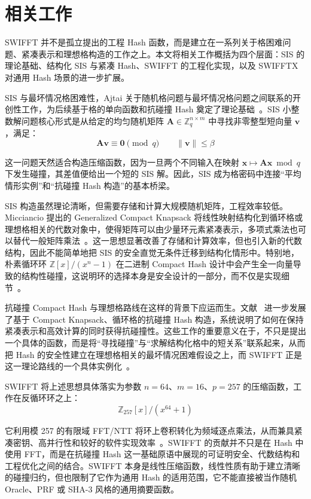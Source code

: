 \documentclass{article}
\begin{document}
\section{相关工作}
SWIFFT 并不是孤立提出的工程 Hash 函数，而是建立在一系列关于格困难问题、紧凑表示和理想格构造的工作之上。本文将相关工作概括为四个层面：SIS 的理论基础、结构化 SIS 与紧凑 Hash、SWIFFT 的工程化实现，以及 SWIFFTX 对通用 Hash 场景的进一步扩展。

SIS 与最坏情况格困难性，Ajtai 关于随机格问题与最坏情况格问题之间联系的开创性工作，为后续基于格的单向函数和抗碰撞 Hash 奠定了理论基础~\cite{Ajtai96}。SIS 小整数解问题核心形式是从给定的均匀随机矩阵 $\bm{A}\in\mathbb{Z}_{q}^{n\times m}$ 中寻找非零整型短向量 $\bm{v}$，满足：
\[ \bm{A}\bm{v}\equiv\bm{0}\pmod q\qquad\|\bm{v}\|\leqslant\beta \]

这一问题天然适合构造压缩函数，因为一旦两个不同输入在映射 $\bm{x}\mapsto \bm{A}\bm{x}\bmod q$ 下发生碰撞，其差值便给出一个短的 SIS 解。因此，SIS 成为格密码中连接“平均情形实例”和“抗碰撞 Hash 构造”的基本桥梁。

SIS 构造虽然理论清晰，但需要存储和计算大规模随机矩阵，工程效率较低。Micciancio 提出的 Generalized Compact Knapsack 将线性映射结构化到循环格或理想格相关的代数对象中，使得矩阵可以由少量环元素紧凑表示，多项式乘法也可以替代一般矩阵乘法~\cite{Micciancio07}。这一思想显著改善了存储和计算效率，但也引入新的代数结构，因此不能简单地把 SIS 的安全直觉无条件迁移到结构化情形中。特别地，朴素循环环 $\mathbb{Z}[x]/(x^n-1)$ 在二进制 Compact Hash 设计中会产生全一向量导致的结构性碰撞，这说明环的选择本身是安全设计的一部分，而不仅是实现细节~\cite{LM06,PR06}。

抗碰撞 Compact Hash 与理想格路线在这样的背景下应运而生。文献~\cite{LM06,PR06} 进一步发展了基于 Compact Knapsack、循环格的抗碰撞 Hash 构造，系统说明了如何在保持紧凑表示和高效计算的同时获得抗碰撞性。这些工作的重要意义在于，不只是提出一个具体的函数，而是将“寻找碰撞”与“求解结构化格中的短关系”联系起来，从而把 Hash 的安全性建立在理想格相关的最坏情况困难假设之上，而 SWIFFT 正是这一理论路线的一个具体实例化~\cite{SWIFFT08}。

SWIFFT 将上述思想具体落实为参数 $n=64$、$m=16$、$p=257$ 的压缩函数，工作在反循环环之上：
\[ \mathbb{Z}_{257}[x]/(x^{64}+1) \]

它利用模 257 的有限域 FFT/NTT 将环上卷积转化为频域逐点乘法，从而兼具紧凑密钥、高并行性和较好的软件实现效率~\cite{SWIFFT08,Repo}。SWIFFT 的贡献并不只是在 Hash 中使用 FFT，而是在抗碰撞 Hash 这一基础原语中展现的可证明安全、代数结构和工程优化之间的结合。SWIFFT 本身是线性压缩函数，线性性质有助于建立清晰的碰撞归约，但也限制了它作为通用 Hash 的适用范围，它不能直接被当作随机 Oracle、PRF 或 SHA-3 风格的通用摘要函数。
\end{document}
